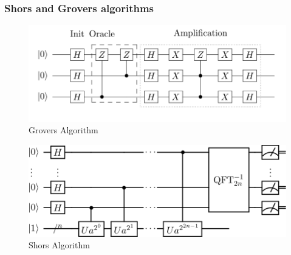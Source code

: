 \documentclass[ucs,10pt]{beamer}
\begin{document}
\begin{frame}
  \frametitle{Shors and Grovers algorithms}
    \begin{figure}[htbp]
      \centering
      \includegraphics[width=.7\textwidth]{../graphics/grover_circuit_3qubits.png}
      \caption{Grovers Algorithm \cite{img:grover}}
      \label{grover}
    \end{figure}
  
    \begin{figure}[htbp]
      \centering
      \includegraphics[width=.5\textwidth]{../graphics/Shor's_algorithm.png}
      \caption{Shors Algorithm\cite{img:shor}}
      \label{shor}
    \end{figure}

\end{frame}
\end{document}
